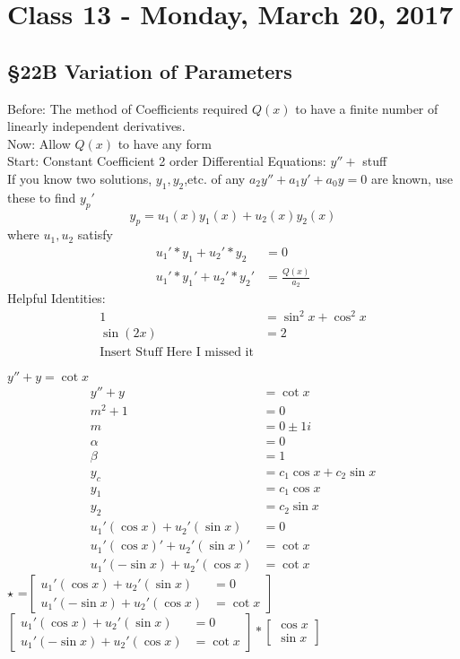 \chapter{Class 13 - Monday, March 20, 2017}
\section*{\S 22B Variation of Parameters}
Before: The method of Coefficients required $Q(x)$ to have a finite number of linearly independent derivatives.\\
Now: Allow $Q(x)$ to have any form\\
Start: Constant Coefficient 2 order Differential Equations: $y''+$ stuff\\
If you know two solutions, $y_1, y_2$,etc. of any $a_2y''+ a_1y'+a_0y=0$ are known, use these to find $y_p'$\\
$$y_p=u_1(x)y_1(x)+u_2(x)y_2(x)$$ where $u_1, u_2$ satisfy\\
\begin{align*}
    u_1'*y_1+u_2'*y_2&=0\\
    u_1'*y_1'+u_2'*y_2'&=\frac{Q(x)}{a_2}
\end{align*}
Helpful Identities: 
\begin{align*}
1&=\sin^2x+\cos^2x\\
\sin(2x)&=2\\
\text{Insert Stuff Here I missed it}
\end{align*}
\begin{ex}
$y''+y=\cot x$
\begin{align*}
y''+y&=\cot x\\
    m^2+1&=0\\
    m&=0 \pm 1i\\
    \alpha &=0\\
    \beta &=1\\
    y_c &= c_1\cos x + c_2 \sin x\\
    y_1&=c_1\cos x \\
    y_2&= c_2 \sin x\\
    u_1'(\cos x)+u_2'(\sin x) &= 0\\
    u_1'(\cos x)' + u_2'(\sin x)' &=\cot x\\
    u_1'(-\sin x) + u_2'(\cos x) &=\cot x
\end{align*}
$\star$ =$\left[
                \begin{array}{ll}
                  u_1'(\cos x)+u_2'(\sin x) &= 0\\
                  u_1'(-\sin x) + u_2'(\cos x) &=\cot x
                \end{array}
              \right] $\\
$\left[
                \begin{array}{ll}
                  u_1'(\cos x)+u_2'(\sin x) &= 0\\
                  u_1'(-\sin x) + u_2'(\cos x) &=\cot x
                \end{array}
              \right] *\left[
              \begin{array}{ll}
                   \cos x\\
                   \sin x
              \end{array}
              \right]
              $
\end{ex}
